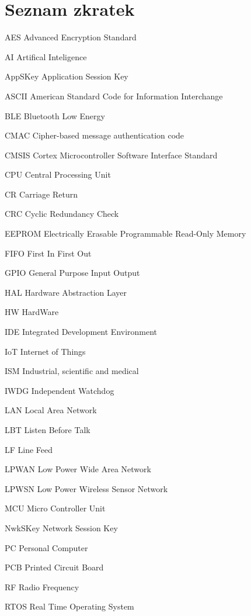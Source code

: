 \documentclass[oneside]{ctuthesis}
\theoremstyle{plain}
\theoremstyle{definition}
\theoremstyle{note}
\newcommand{\abbrlabel}[1]{\makebox[3cm][l]{\textbf{#1}\ \dotfill}}
\newenvironment{abbreviations}{\begin{list}{}{\renewcommand{\makelabel}{\abbrlabel}}}{\end{list}}
\begin{document}
\section{Seznam zkratek}
\begin{abbreviations}
	\item[AES]		Advanced Encryption Standard 
	\item[AI]		Artifical Inteligence
	\item[AppSKey]	Application Session Key	
	\item[ASCII] 	American Standard Code for Information Interchange
	\item[BLE]		Bluetooth Low Energy 
	\item[CMAC]		Cipher-based message authentication code 
	\item[CMSIS]	Cortex Microcontroller Software Interface Standard  
	\item[CPU]		Central Processing Unit
	\item[CR] 		Carriage Return
	\item[CRC] 		Cyclic Redundancy Check
	\item[EEPROM] 	Electrically Erasable Programmable Read-Only Memory
	\item[FIFO]		First In First Out 
	\item[GPIO]		General Purpose Input Output 
	\item[HAL]		Hardware Abstraction Layer 
	\item[HW]		HardWare
	\item[IDE]		Integrated Development Environment 
	\item[IoT] 		Internet of Things
	\item[ISM]		Industrial, scientific and medical 
	\item[IWDG]		Independent Watchdog 
	\item[LAN]		Local Area Network
	\item[LBT]		Listen Before Talk 
	\item[LF]		Line Feed 
	\item[LPWAN]   	Low Power Wide Area Network 
	\item[LPWSN] 	Low Power Wireless Sensor Network	
	\item[MCU] 		Micro Controller Unit
	\item[NwkSKey]	Network Session Key
	\item[PC]		Personal Computer 
	\item[PCB]		Printed Circuit Board 
	\item[RF]		Radio Frequency
	\item[RTOS]		Real Time Operating System 


\end{abbreviations}
\end{document}
